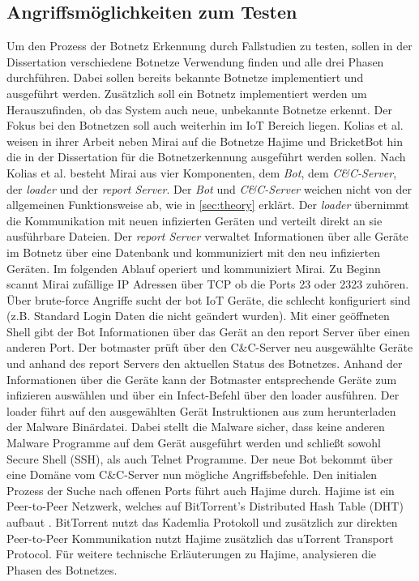 \subsection*{Angriffsmöglichkeiten zum Testen}
Um den Prozess der Botnetz Erkennung durch Fallstudien zu testen, sollen in der Dissertation verschiedene Botnetze Verwendung finden und alle drei Phasen durchführen. Dabei sollen bereits bekannte
Botnetze implementiert und ausgeführt werden. Zusätzlich soll ein Botnetz implementiert werden um Herauszufinden, ob das System auch neue, unbekannte Botnetze erkennt. Der Fokus bei den Botnetzen 
soll auch weiterhin im IoT Bereich liegen. Kolias et al. \cite{DBLP:journals/computer/KoliasKSV17} weisen in ihrer Arbeit neben Mirai auf die Botnetze Hajime und BricketBot hin die in der Dissertation
für die Botnetzerkennung ausgeführt werden sollen. Nach Kolias et al. besteht Mirai aus vier Komponenten, dem \textit{Bot}, dem \textit{C\&C-Server}, der \textit{loader} und der \textit{report Server}. 
Der \textit{Bot} und \textit{C\&C-Server} weichen nicht von der allgemeinen Funktionsweise ab, wie in \ref{sec:theory} erklärt. Der \textit{loader} übernimmt die Kommunikation mit neuen infizierten 
Geräten und verteilt direkt an sie ausführbare Dateien. Der \textit{report Server} verwaltet Informationen über alle Geräte im Botnetz über eine Datenbank und kommuniziert mit den neu infizierten Geräten. 
Im folgenden Ablauf operiert und kommuniziert Mirai. 
Zu Beginn scannt Mirai zufällige IP Adressen über TCP ob die Ports 23 oder 2323 zuhören. Über brute-force Angriffe sucht der bot IoT Geräte, die schlecht konfiguriert sind (z.B. Standard Login Daten die
nicht geändert wurden). Mit einer geöffneten Shell gibt der Bot Informationen über das Gerät an den report Server über einen anderen Port. Der botmaster prüft über den C\&C-Server neu ausgewählte Geräte 
und anhand des report Servers den aktuellen Status des Botnetzes. Anhand der Informationen über die Geräte kann der Botmaster entsprechende Geräte zum infizieren auswählen und über ein Infect-Befehl 
über den loader ausführen. Der loader führt auf den ausgewählten Gerät Instruktionen aus zum herunterladen der Malware Binärdatei. Dabei stellt die Malware sicher, dass keine anderen Malware Programme auf
dem Gerät ausgeführt werden und schließt sowohl Secure Shell (SSH), als auch Telnet Programme. Der neue Bot bekommt über eine Domäne vom C\&C-Server nun mögliche Angriffsbefehle. Den initialen Prozess 
der Suche nach offenen Ports führt auch Hajime durch. Hajime ist ein Peer-to-Peer Netzwerk, welches auf BitTorrent's Distributed Hash Table (DHT) aufbaut \cite{DBLP:conf/ndss/HerwigHHRL19,2017AnalyzingTP}. 
BitTorrent nutzt das Kademlia Protokoll \cite{DBLP:conf/iptps/MaymounkovM02} und zusätzlich zur direkten Peer-to-Peer Kommunikation nutzt Hajime zusätzlich das uTorrent Transport Protocol. Für weitere
technische Erläuterungen zu Hajime, analysieren \cite{DBLP:conf/ndss/HerwigHHRL19} die Phasen des Botnetzes.

